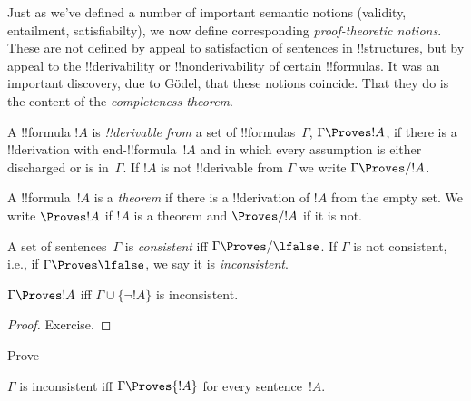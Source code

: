 \documentclass[../../include/open-logic-section]{subfiles}
\begin{document}

\begin{explain}
Just as we've defined a number of important semantic notions
(validity, entailment, satisfiabilty), we now define corresponding
\emph{proof-theoretic notions}.  These are not defined by appeal to
satisfaction of sentences in !!{structure}s, but by appeal to the
!!{derivability} or !!{nonderivability} of certain !!{formula}s.  It was
an important discovery, due to G\"odel, that these notions coincide.
That they do is the content of the \emph{completeness theorem}.
\end{explain}

\begin{defn}[!!^{derivability}]
A !!{formula} $!A$ is \emph{!!{derivable} from} a set of
!!{formula}s~$\Gamma$, $\Gamma \Proves !A$, if there is a
!!{derivation} with end-!!{formula}~$!A$ and in which every assumption
is either discharged or is in~$\Gamma$. If $!A$ is not
!!{derivable} from $\Gamma$ we write $\Gamma \Proves/ !A$.
\end{defn}

\begin{defn}[Theorems]
A !!{formula}~$!A$ is a \emph{theorem} if there is a !!{derivation} of
$!A$ from the empty set.  We write $\Proves !A$ if $!A$ is a theorem
and $\Proves/ !A$ if it is not.
\end{defn}

\begin{defn}[Consistency]
A set of sentences~$\Gamma$ is \emph{consistent} iff $\Gamma
\Proves/ \lfalse$.  If $\Gamma$ is not consistent, i.e., if
$\Gamma \Proves \lfalse$, we say it is \emph{inconsistent}.
\end{defn}

\begin{prop}
$\Gamma \Proves !A$ iff $\Gamma \cup \{\lnot !A\}$ is inconsistent.
\end{prop}

\begin{proof}
Exercise.
\end{proof}

\begin{prob}
Prove 
\end{prob}

\begin{prop}
$\Gamma$ is inconsistent iff $\Gamma \Proves {!A}$ for every
  sentence~$!A$.
\end{prop}
\end{document}

